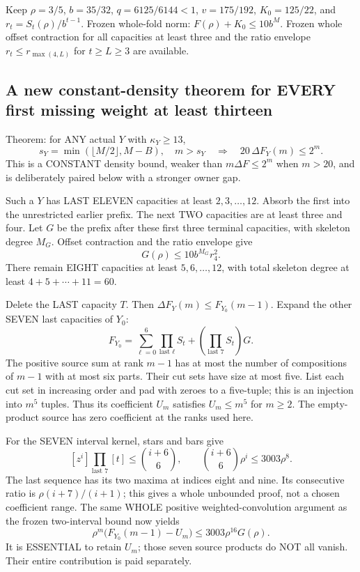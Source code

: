 \documentclass[11pt]{article}
\begin{document}
\par\medskip

Keep $\rho=3/5$, $b=35/32$, $q=6125/6144<1$, $v=175/192$,
$K_0=125/22$, and $r_t=S_t(\rho)/b^{t-1}$. Frozen whole-fold norm:
$F(\rho)+K_0\le10b^M$. Frozen whole offset contraction for all
capacities at least three and the ratio envelope $r_t\le r_{\max(4,L)}$
for $t\ge L\ge3$ are available.

\subsection{A new constant-density theorem for EVERY first missing weight at least thirteen}
Theorem: for ANY actual $Y$ with $\kappa_Y\ge13$,
\[
 s_Y=\min(\lfloor M/2\rfloor,M-B),\quad m>s_Y
       \quad\Longrightarrow\quad20\,\Delta F_Y(m)\le2^m.       \tag{1}
\]
This is a CONSTANT density bound, weaker than $m\Delta F\le2^m$
when $m>20$, and is deliberately paired below with a stronger owner gap.

Such a $Y$ has LAST ELEVEN capacities at least $2,3,\ldots,12$.
Absorb the first into the unrestricted earlier prefix. The next TWO
capacities are at least three and four. Let $G$ be the prefix after
these first three terminal capacities, with skeleton degree $M_G$.
Offset contraction and the ratio envelope give
\[
                      G(\rho)\le10b^{M_G}r_4^2.       \tag{2}
\]
There remain EIGHT capacities at least $5,6,\ldots,12$, with total
skeleton degree at least $4+5+\cdots+11=60$.

Delete the LAST capacity $T$. Then
$\Delta F_Y(m)\le F_{Y_0}(m-1)$.
Expand the other SEVEN last capacities of $Y_0$:
\[
 F_{Y_0}=\sum_{\ell=0}^6\prod_{\text{last }\ell}S_t
             +\left(\prod_{\text{last }7}S_t\right)G.          \tag{3}
\]
The positive source sum at rank $m-1$ has at most the number of
compositions of $m-1$ with at most six parts. Their cut sets have size
at most five. List each cut set in increasing order and pad with zeroes
to a five-tuple; this is an injection into $m^5$ tuples. Thus its
coefficient $U_m$ satisfies $U_m\le m^5$ for $m\ge2$.
The empty-product source has zero coefficient at the ranks used here.

For the SEVEN interval kernel, stars and bars give
\[
 [z^i]\prod_{\text{last }7}[t]\le\binom{i+6}{6},\qquad
                \binom{i+6}{6}\rho^i\le3003\rho^8.     \tag{4}
\]
The last sequence has its two maxima at indices eight and nine.
Its consecutive ratio is $\rho(i+7)/(i+1)$; this gives a whole
unbounded proof, not a chosen coefficient range. The same WHOLE
positive weighted-convolution argument as the frozen two-interval
bound now yields
\[
 \rho^m\bigl(F_{Y_0}(m-1)-U_m\bigr)
                         \le3003\rho^{16}G(\rho).    \tag{5}
\]
It is ESSENTIAL to retain $U_m$; those seven source products do NOT
all vanish. Their entire contribution is paid separately.
\end{document}
